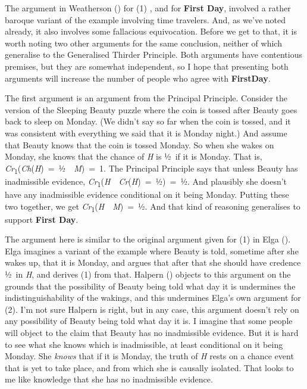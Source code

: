 \documentclass[
  11pt,
  letterpaper,
  DIV=11,
  numbers=noendperiod,
  twoside]{scrartcl}
\begin{document}
The argument in Weatherson () for
(1) , and for \textbf{First Day}, involved a rather baroque variant of
the example involving time travelers. And, as we've noted already, it
also involves some fallacious equivocation. Before we get to that, it is
worth noting two other arguments for the same conclusion, neither of
which generalise to the Generalised Thirder Principle. Both arguments
have contentious premises, but they are somewhat independent, so I hope
that presenting both arguments will increase the number of people who
agree with \textbf{FirstDay}.

The first argument is an argument from the Principal Principle. Consider
the version of the Sleeping Beauty puzzle where the coin is tossed after
Beauty goes back to sleep on Monday. (We didn't say so far when the coin
is tossed, and it was consistent with everything we said that it is
Monday night.) And assume that Beauty knows that the coin is tossed
Monday. So when she wakes on Monday, she knows that the chance of
\emph{H} is ½~if it is Monday. That is,
\emph{Cr}\textsubscript{1}(\emph{Ch}(\emph{H})~=~½~\textbar~\emph{M})~=~1.
The Principal Principle says that unless Beauty has inadmissible
evidence,
\emph{Cr}\textsubscript{1}(\emph{H}~\textbar~\emph{Cr}(\emph{H})~=~½)~=~½.
And plausibly she doesn't have any inadmissible evidence conditional on
it being Monday. Putting these two together, we get
\emph{Cr}\textsubscript{1}(\emph{H}~\textbar~\emph{M})~=~½. And that
kind of reasoning generalises to support \textbf{First Day}.

The argument here is similar to the original argument given for (1) in
Elga (). Elga imagines a variant of the
example where Beauty is told, sometime after she wakes up, that it is
Monday, and argues that after that she should have credence ½~in
\emph{H}, and derives (1) from that. Halpern
() objects to this argument on the
grounds that the possibility of Beauty being told what day it is
undermines the indistinguishability of the wakings, and this undermines
Elga's own argument for (2). I'm not sure Halpern is right, but in any
case, this argument doesn't rely on any possibility of Beauty being told
what day it is. I imagine that some people will object to the claim that
Beauty has no inadmissible evidence. But it is hard to see what she
knows which is inadmissible, at least conditional on it being Monday.
She \emph{knows} that if it is Monday, the truth of \emph{H} rests on a
chance event that is yet to take place, and from which she is causally
isolated. That looks to me like knowledge that she has no inadmissible
evidence.
\end{document}
